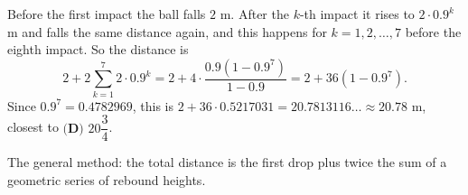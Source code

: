Before the first impact the ball falls $2$ m. After the $k$-th impact it rises to $2\cdot0.9^k$ m and falls the same distance again, and this happens for $k=1,2,\dots,7$ before the eighth impact. So the distance is
\[2+2\sum_{k=1}^{7}2\cdot0.9^k=2+4\cdot\dfrac{0.9\left(1-0.9^7\right)}{1-0.9}=2+36\left(1-0.9^7\right).\]
Since $0.9^7=0.4782969$, this is $2+36\cdot0.5217031=20.7813116\ldots\approx20.78$ m, closest to $\boxed{\textbf{(D) }20\dfrac34}$.

The general method: the total distance is the first drop plus twice the sum of a geometric series of rebound heights.

